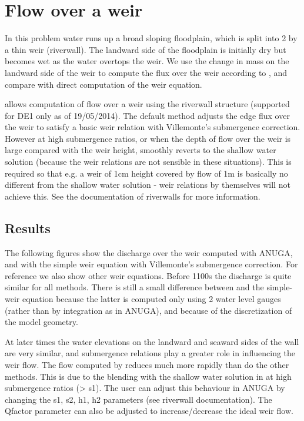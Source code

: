 
\section{Flow over a weir}

In this problem water runs up a broad sloping floodplain, which is split into 2 by a thin weir (riverwall). The landward side of the floodplain is initially dry but becomes wet as the water overtops the weir. We use the change in mass on the landward side of the weir to compute the flux over the weir according to \anuga{}, and compare with direct computation of the weir equation. 

\anuga{} allows computation of flow over a weir using the riverwall structure (supported for DE1 only as of 19/05/2014). The default method adjusts the edge flux over the weir to satisfy a basic weir relation with Villemonte's submergence correction. However at high submergence ratios, or when the depth of flow over the weir is large compared with the weir height, \anuga{} smoothly reverts to the shallow water solution (because the weir relations are not sensible in these situations). This is required so that e.g. a weir of 1cm height covered by flow of 1m is basically no different from the shallow water solution - weir relations by themselves will not achieve this. See the documentation of riverwalls for more information.

\subsection{Results}

The following figures show the discharge over the weir computed with ANUGA, and with the simple weir equation with Villemonte's submergence correction. For reference we also show other weir equations. Before 1100s the discharge is quite similar for all methods. There is still a small difference between \anuga{} and the simple-weir equation because the latter is computed only using 2 water level gauges (rather than by integration as in ANUGA), and because of the discretization of the model geometry.

At later times the water elevations on the landward and seaward sides of the wall are very similar, and submergence relations play a greater role in influencing the weir flow. The flow computed by \anuga{} reduces much more rapidly than do the other methods. This is due to the blending with the shallow water solution in \anuga{} at high submergence ratios (> s1). The user can adjust this behaviour in ANUGA by changing the s1, s2, h1, h2 parameters (see riverwall documentation). The Qfactor parameter can also be adjusted to increase/decrease the ideal weir flow.

